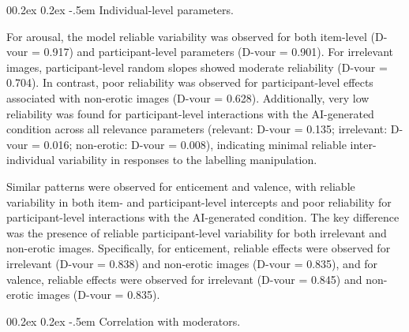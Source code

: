 \documentclass[
  jou,
  floatsintext,
  longtable,
  nolmodern,
  notxfonts,
  notimes,
  colorlinks=true,linkcolor=blue,citecolor=blue,urlcolor=blue]{apa7}
\makeatletter
\renewcommand{\paragraph}{\@startsection{paragraph}{4}{\parindent}%
	{0\baselineskip \@plus 0.2ex \@minus 0.2ex}%
	{-.5em}%
	{\normalfont\normalsize\bfseries\typesectitle}}
\makeatother
\begin{document}
\paragraph{Individual-level
parameters.}\label{individual-level-parameters}

For arousal, the model reliable variability was observed for both
item-level (D-vour = 0.917) and participant-level parameters (D-vour =
0.901). For irrelevant images, participant-level random slopes showed
moderate reliability (D-vour = 0.704). In contrast, poor reliability was
observed for participant-level effects associated with non-erotic images
(D-vour = 0.628). Additionally, very low reliability was found for
participant-level interactions with the AI-generated condition across
all relevance parameters (relevant: D-vour = 0.135; irrelevant: D-vour =
0.016; non-erotic: D-vour = 0.008), indicating minimal reliable
inter-individual variability in responses to the labelling manipulation.

Similar patterns were observed for enticement and valence, with reliable
variability in both item- and participant-level intercepts and poor
reliability for participant-level interactions with the AI-generated
condition. The key difference was the presence of reliable
participant-level variability for both irrelevant and non-erotic images.
Specifically, for enticement, reliable effects were observed for
irrelevant (D-vour = 0.838) and non-erotic images (D-vour = 0.835), and
for valence, reliable effects were observed for irrelevant (D-vour =
0.845) and non-erotic images (D-vour = 0.835).

\paragraph{Correlation with
moderators.}\label{correlation-with-moderators}
\end{document}
